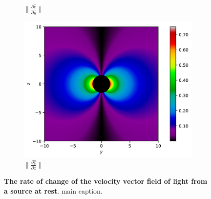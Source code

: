 \begin{figure}[H]
\begin{subfigure}{0.32\textwidth}
		\caption{$\|\frac{\partial \underline{\hat{c}}}{\partial y}\|$}
		\label{fig: Rate of change of lights velocity field of rest source subfig_2}
	\end{subfigure}
	\begin{subfigure}{0.32\textwidth}
		\centering
		\includegraphics[width=\textwidth]{images/pdf/Rate_of_change_of_lights_velocity_field_with_respect_to_z_u_is_0.pdf}
		\caption{$\|\frac{\partial \underline{\hat{c}}}{\partial z}\|$}
		\label{fig: Rate of change of lights velocity field of rest source subfig_3}
	\end{subfigure}
	\caption{\textbf{The rate of change of the velocity vector field of light from a source at rest}. main caption.}
	\label{fig: Rate of change of lights velocity field of rest source}
\end{figure}


